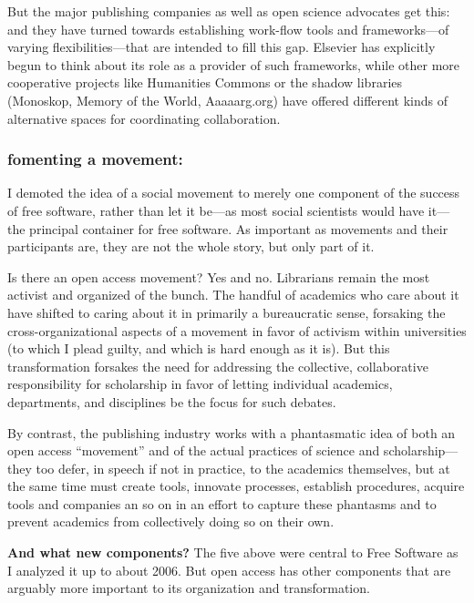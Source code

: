 \documentclass[11pt]{article}
\begin{document}
But the major publishing companies as well as open science advocates get this: and they have turned towards establishing work-flow tools and frameworks---of varying flexibilities---that are intended to fill this gap.  Elsevier has explicitly begun to think about its role as a provider of such frameworks, while other more cooperative projects like Humanities Commons or the shadow libraries (Monoskop, Memory of the World, Aaaaarg.org) have offered different kinds of alternative spaces for coordinating collaboration.

\subsubsection*{\textbf{fomenting a movement}:}
\label{sec:org291518c}

I demoted the idea of a social movement to merely one component of the success of free software, rather than let it be---as most social scientists would have it---the principal container for free software.  As important as movements and their participants are, they are not the whole story, but only part of it.  

Is there an open access movement?  Yes and no.  Librarians remain the most activist and organized of the bunch.  The handful of academics who care about it have shifted to caring about it in primarily a bureaucratic sense, forsaking the cross-organizational aspects of a movement in favor of activism within universities (to which I plead guilty, and which is hard enough as it is).  But this transformation forsakes the need for addressing the collective, collaborative responsibility for scholarship in favor of letting individual academics, departments, and disciplines be the focus for such debates. 

By contrast, the publishing industry works with a phantasmatic idea of both an open access ``movement'' and of the actual practices of science and scholarship--- they too defer, in speech if not in practice, to the academics themselves, but at the same time must create tools, innovate processes, establish procedures, acquire tools and companies an so on in an effort to capture these phantasms and to prevent academics from collectively doing so on their own. 


\textbf{And what new components?}  The five above were central to Free Software as I analyzed it up to about 2006.  But open access has other components that are arguably more important to its organization and transformation.
\end{document}
